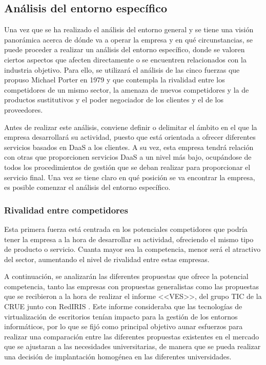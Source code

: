 \clearpage

\subsection{Análisis del entorno específico}
Una vez que se ha realizado el análisis del entorno general y se tiene una visión panorámica acerca de dónde va a operar la empresa y en qué circunstancias, se puede proceder a realizar un análisis del entorno específico, donde se valoren ciertos aspectos que afecten directamente o se encuentren relacionados con la industria objetivo. Para ello, se utilizará el análisis de las cinco fuerzas que propuso Michael Porter en 1979 y que contempla la rivalidad entre los competidores de un mismo sector, la amenaza de nuevos competidores y la de productos sustitutivos y el poder negociador de los clientes y el de los proveedores. 

Antes de realizar este análisis, conviene definir o delimitar el ámbito en el que la empresa desarrollará su actividad, puesto que está orientada a ofrecer diferentes servicios basados en \acs{DaaS} a los clientes. A su vez, esta empresa tendrá relación con otras que proporcionen servicios \acs{DaaS} a un nivel más bajo, ocupándose de todos los procedimientos de gestión que se deban realizar para proporcionar el servicio final. Una vez se tiene claro en qué posición se va encontrar la empresa, es posible comenzar el análisis del entorno específico.

\subsubsection{Rivalidad entre competidores}
Esta primera fuerza está centrada en los potenciales competidores que podría tener la empresa a la hora de desarrollar su actividad, ofreciendo el mismo tipo de producto o servicio. Cuanta mayor sea la competencia, menor será el atractivo del sector, aumentando el nivel de rivalidad entre estas empresas.

A continuación, se analizarán las diferentes propuestas que ofrece la potencial competencia, tanto las empresas con propuestas generalistas como las propuestas que se recibieron a la hora de realizar el informe <<\acf{VES}>>, del grupo \acs{TIC} de la \acs{CRUE} junto con RedIRIS \cite{rediris2015}. Este informe consideraba que las tecnologías de virtualización de escritorios tenían impacto para la gestión de los entornos informáticos, por lo que se fijó como principal objetivo aunar esfuerzos para realizar una comparación entre las diferentes propuestas existentes en el mercado que se ajustaran a las necesidades universitarias, de manera que se pueda realizar una decisión de implantación homogénea en las diferentes universidades.

